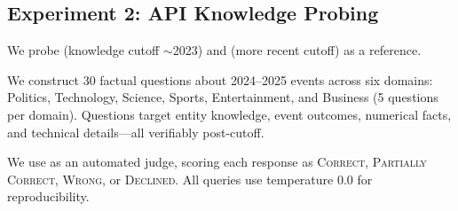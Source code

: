 \subsection{Experiment 2: API Knowledge Probing}
\label{sec:method-probing}

 We probe \gptthree (knowledge cutoff $\sim$2023) and \gptfourmini (more recent cutoff) as a reference.

 We construct 30 factual questions about 2024--2025 events across six domains: Politics, Technology, Science, Sports, Entertainment, and Business (5 questions per domain). Questions target entity knowledge, event outcomes, numerical facts, and technical details---all verifiably post-cutoff.

 We use \gptfourmini as an automated judge, scoring each response as \textsc{Correct}, \textsc{Partially Correct}, \textsc{Wrong}, or \textsc{Declined}. All queries use temperature 0.0 for reproducibility.
